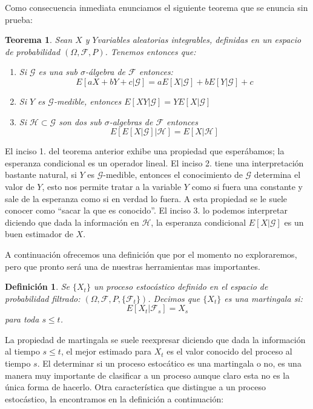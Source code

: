\documentclass{extreport}
\theoremstyle{definicion}
\newtheorem{definition}{Definición}[chapter]
\theoremstyle{propiedad}
\theoremstyle{teorema}
\newtheorem{teorema}{Teorema}[chapter]
\begin{document}
Como consecuencia inmediata enunciamos el siguiente teorema que se enuncia sin prueba:
\begin{teorema}
Sean $X$ y $Y$variables  aleatorias integrables, definidas en un espacio de probabilidad $(\Omega, \mathcal{F},P)$.   Tenemos entonces que:
\begin{enumerate}
    \item Si $\mathcal{G}$ es una sub $\sigma$-álgebra de $\mathcal{F}$ entonces:
        $$
        E\left[a X + bY +c\vert \mathcal{G}\right] = aE\left[X\vert \mathcal{G}\right] +bE\left[Y\vert \mathcal{G}\right] +c
        $$
    \item Si $Y$ es $\mathcal{G}$-medible, entonces $E\left[XY\vert \mathcal{G}\right] = YE\left[X\vert \mathcal{G}\right]$  
    \item Si $\mathcal{H}\subset\mathcal{G}$ son dos sub $\sigma$-algebras de $\mathcal{F}$  entonces
        $$
        E\left[E\left[X\vert \mathcal{G}\right]\vert \mathcal{H}\right] = E\left[X\vert \mathcal{H}\right]
        $$    
\end{enumerate}
\end{teorema}

El inciso 1. del teorema anterior exhibe una propiedad que esperábamos; la esperanza condicional es un operador lineal.  El inciso 2. tiene una interpretación bastante natural, si $Y$ es $\mathcal{G}$-medible, entonces el conocimiento de $\mathcal{G}$ determina el valor de $Y$, esto nos permite tratar a la variable $Y$ como si fuera una constante y sale de la esperanza como si en verdad lo fuera. A esta propiedad se le suele conocer como ``sacar la que es conocido''. El inciso 3. lo podemos interpretar diciendo que dada la información en $\mathcal{H}$, la esperanza condicional $E[X\vert \mathcal{G}]$ es un buen estimador de $X$.

A continuación ofrecemos una definición que por el momento no exploraremos, pero que pronto será una de nuestras herramientas mas importantes.
\begin{definition}
    Se $\{X_t\}$ un proceso estocástico definido en el espacio de probabilidad filtrado: $(\Omega, \mathcal{F}, P, \{\mathcal{F}_t\})$. Decimos que $\{X_t\}$ es una \emph{martingala} si:
    $$
    E\left[X_t\vert \mathcal{F}_s\right] = X_s
    $$
    para toda $s\leq t$.
\end{definition}
La propiedad de martingala se suele reexpresar diciendo que dada la información al tiempo $s\leq t$, el mejor estimado para $X_t$ es el valor conocido del proceso al tiempo $s$. El determinar si un proceso estocático es una martingala o no, es una manera muy importante de clasificar a un proceso aunque claro esta no es la única forma de hacerlo. Otra característica que distingue a un proceso estocástico, la encontramos en la definición a continuación:
\end{document}
